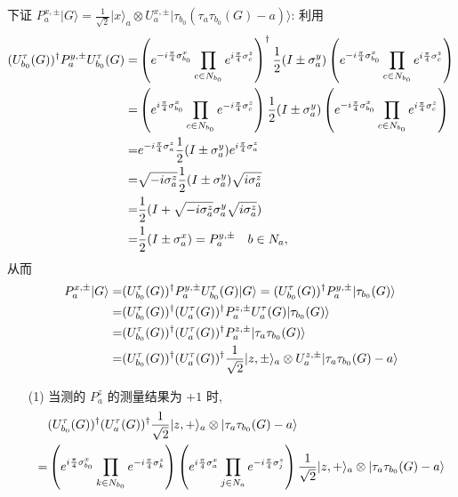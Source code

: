 \documentclass{assignment}
\begin{document}
\begin{pf}
    下证 $P_a^{x,\pm}\lvert G\rangle=\frac{1}{\sqrt{2}}\lvert x\rangle_a\otimes U_a^{x,\pm}\lvert\tau_{b_0}(\tau_a\tau_{b_0}(G)-a)\rangle$: 利用
    \begin{align}
        \notag(U_{b_0}^{\tau}(G))^{\dagger}P_a^{y,\pm}U_{b_0}^{\tau}(G)=&\left(e^{-i\frac{\pi}{4}\sigma_{b_0}^x}\prod_{c\in N_{b_0}}e^{i\frac{\pi}{4}\sigma_c^z}\right)^{\dagger}\frac{1}{2}(I\pm\sigma_a^y)\left(e^{-i\frac{\pi}{4}\sigma_{b_0}^x}\prod_{c\in N_{b_0}}e^{i\frac{\pi}{4}\sigma_c^z}\right)\\
        \notag=&\left(e^{i\frac{\pi}{4}\sigma_{b_0}^x}\prod_{c\in N_{b_0}}e^{-i\frac{\pi}{4}\sigma_c^z}\right)\frac{1}{2}(I\pm\sigma_a^y)\left(e^{-i\frac{\pi}{4}\sigma_{b_0}^x}\prod_{c\in N_{b_0}}e^{i\frac{\pi}{4}\sigma_c^z}\right)\\
        \notag=&e^{-i\frac{\pi}{4}\sigma_a^z}\frac{1}{2}(I\pm\sigma_a^y)e^{i\frac{\pi}{4}\sigma_a^z}\\
        \notag=&\sqrt{-i\sigma_a^z}\frac{1}{2}(I\pm\sigma_a^y)\sqrt{i\sigma_a^z}\\
        \notag=&\frac{1}{2}(I+\sqrt{-i\sigma_a^z}\sigma_a^y\sqrt{i\sigma_a^z})\\
        =&\frac{1}{2}(I\pm\sigma_a^x)=P_a^{y,\pm}\quad b\in N_a,
    \end{align}
    从而
    \begin{align}
        \notag P_a^{x,\pm}\lvert G\rangle=&(U_{b_0}^{\tau}(G))^{\dagger}P_a^{y,\pm}U_{b_0}^{\tau}(G)\lvert G\rangle=(U_{b_0}^{\tau}(G))^{\dagger}P_a^{y,\pm}\lvert\tau_{b_0}(G)\rangle\\
        \notag=&(U_{b_0}^{\tau}(G))^{\dagger}(U_a^{\tau}(G))^{\dagger}P_a^{z,\pm}U_a^{\tau}(G)\lvert\tau_{b_0}(G)\rangle\\
        \notag=&(U_{b_0}^{\tau}(G))^{\dagger}(U_a^{\tau}(G))^{\dagger}P_a^{z,\pm}\lvert\tau_a\tau_{b_0}(G)\rangle\\
        \notag=&(U_{b_0}^{\tau}(G))^{\dagger}(U_a^{\tau}(G))^{\dagger}\frac{1}{\sqrt{2}}\lvert z,\pm\rangle_a\otimes U_a^{z,\pm}\lvert\tau_a\tau_{b_0}(G)-a\rangle
    \end{align}
    \begin{itemize}
        \item[(1)] 当测的 $P_a^z$ 的测量结果为 $+1$ 时,
        \begin{align}
            \notag&(U_{b_0}^{\tau}(G))^{\dagger}(U_a^{\tau}(G))^{\dagger}\frac{1}{\sqrt{2}}\lvert z,+\rangle_a\otimes\lvert\tau_a\tau_{b_0}(G)-a\rangle\\
            \notag=&\left(e^{i\frac{\pi}{4}\sigma_{b_0}^x}\prod_{k\in N_{b_0}}e^{-i\frac{\pi}{4}\sigma_k^z}\right)\left(e^{i\frac{\pi}{4}\sigma_a^x}\prod_{j\in N_a}e^{-i\frac{\pi}{4}\sigma_j^z}\right)\frac{1}{\sqrt{2}}\lvert z,+\rangle_a\otimes\lvert\tau_a\tau_{b_0}(G)-a\rangle\\

\end{align}
\end{itemize}
\end{pf}
\end{document}
